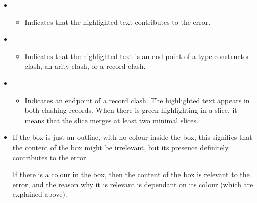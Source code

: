 \documentclass{report}
\begin{document}
\begin{itemize}

\item {}

\begin{itemize}
\item Indicates that the highlighted text contributes to the error.
\end{itemize}

\item {}


\begin{itemize}
\item Indicates that the highlighted text is an end point of a
  type constructor clash, an arity clash, or a record clash.


\end{itemize}

\item {}


\begin{itemize}
\item Indicates an endpoint of a record clash. The highlighted text
  appears in both clashing records. When there is green
  highlighting in a slice, it means that the slice merges at least two
  minimal slices.
\end{itemize}


\item {}

\subitem If the box is just an outline, with no colour inside the box,
  this signifies that the content of the box might be irrelevant, but its
  presence definitely contributes to the error.

\subitem If there is a colour in the box, then the
  content of the box is relevant to the error, and the reason why it
  is relevant is dependant on its colour (which are explained above).


\end{itemize}
\end{document}

